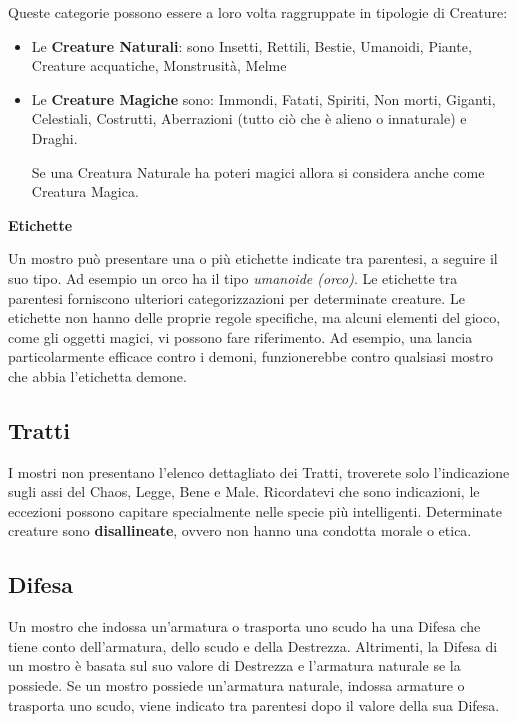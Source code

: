 \begin{multicols}{2}
	\medskip

	Queste categorie possono essere a loro volta raggruppate in tipologie di Creature:
	\smallskip
	\begin{itemize}
		\item
		Le \textbf{Creature Naturali}: sono Insetti, Rettili, Bestie, Umanoidi, Piante, Creature acquatiche, Monstrusità, Melme
		\item
		Le \textbf{Creature Magiche} sono: Immondi, Fatati, Spiriti, Non morti, Giganti, Celestiali, Costrutti, Aberrazioni (tutto ciò che è alieno o innaturale) e Draghi.

		Se una Creatura Naturale ha poteri magici allora si considera anche come Creatura Magica.
	\end{itemize}


	\medskip\textbf{Etichette}

	Un mostro può presentare una o più etichette indicate tra parentesi, a seguire il suo tipo. Ad esempio un orco ha il tipo \textit{umanoide (orco)}. Le etichette tra parentesi forniscono ulteriori categorizzazioni per determinate creature. Le etichette non hanno delle proprie regole specifiche, ma alcuni elementi del gioco, come gli oggetti magici, vi possono fare riferimento. Ad esempio, una lancia particolarmente efficace contro i demoni, funzionerebbe contro qualsiasi mostro che abbia l'etichetta demone.

	\subsection{Tratti}

	I mostri non presentano l'elenco dettagliato dei Tratti, troverete solo l'indicazione sugli assi del Chaos, Legge, Bene e Male. Ricordatevi che sono indicazioni, le eccezioni possono capitare specialmente nelle specie più intelligenti.
	Determinate creature sono \textbf{disallineate}, ovvero non hanno una condotta morale o etica.

	\subsection{Difesa}

	Un mostro che indossa un'armatura o trasporta uno scudo ha una Difesa che tiene conto dell'armatura, dello scudo e della Destrezza. Altrimenti, la Difesa di un mostro è basata sul suo valore di Destrezza e l'armatura naturale se la possiede. Se un mostro possiede un'armatura naturale, indossa armature o trasporta uno scudo, viene indicato tra parentesi dopo il valore della sua Difesa.


\end{multicols}
